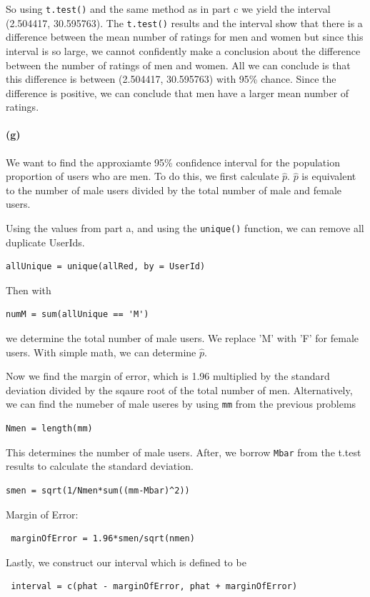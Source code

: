 \documentclass[fleqn]{article}
\begin{document}
		So using \texttt{t.test()} and the same method as in part c we yield the interval (2.504417, 30.595763). The \texttt{t.test()} results and the interval show that there is a difference between the mean number of ratings for men and women but since this interval is so large, we cannot confidently make a conclusion about the difference between the number of ratings of men and women. All we can conclude is that this difference is between (2.504417, 30.595763) with 95\% chance. Since the difference is positive, we can conclude that men have a larger mean number of ratings.


	\paragraph{(g)}
		We want to find the approxiamte 95\% confidence interval for the population proportion of users who are men. To do this, we first calculate $ \hat{p}$. $\hat{p}$ is equivalent to the number of male users divided by the total number of male and female users. 

		Using the values from part a, and using the \texttt{unique()} function, we can remove all duplicate UserIds.
		\begin{verbatim}allUnique = unique(allRed, by = UserId)\end{verbatim}

		Then with \begin{verbatim}numM = sum(allUnique == 'M')\end{verbatim} we determine the total number of male users. We replace 'M' with 'F' for female users. With simple math, we can determine $\hat{p}$.

		Now we find the margin of error, which is 1.96 multiplied by the standard deviation divided by the sqaure root of the total number of men. Alternatively, we can find the numeber of male useres by using \texttt{mm} from the previous problems 
		\begin{verbatim}Nmen = length(mm)\end{verbatim} 
		This determines the number of male users. After, we borrow \texttt{Mbar} from the t.test results to calculate the standard deviation.
		\begin{verbatim}smen = sqrt(1/Nmen*sum((mm-Mbar)^2))\end{verbatim}
		Margin of Error:\begin{verbatim} marginOfError = 1.96*smen/sqrt(nmen)\end{verbatim}
		Lastly, we construct our interval which is defined to be \begin{verbatim} interval = c(phat - marginOfError, phat + marginOfError)\end{verbatim}
		
\end{document}
